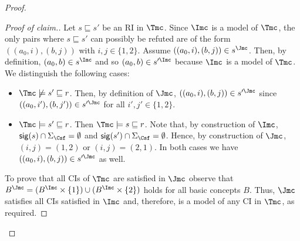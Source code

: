 \documentclass{lmcs}
\theoremstyle{definition}
\let\OriginalQedSymbol\qedsymbol
\renewcommand{\qedsymbol}{\OriginalQedSymbol\setcounter{claim}{0}}
\let\NormalQedSymbol\qedsymbol
\newenvironment{clmproof}[1]{\renewcommand{\qedsymbol}{$\dashv$}\begin{proof}[Proof of claim.]\space#1}{\end{proof}\renewcommand{\qedsymbol}{\NormalQedSymbol}}
\begin{document}
\begin{proof}
\begin{clmproof}
Let $s\sqsubseteq s'$ be an RI in $\Tmc$. Since $\Imc$ is a
model of $\Tmc$, the only pairs where $s\sqsubseteq s'$ can possibly
be refuted are of the form $((a_{0},i),(b,j))$ with $i,j\in \{1,2\}$.
Assume $((a_{0},i),(b,j)) \in s^{\Jmc}$. Then, by definition,
$(a_{0},b)\in s^{\Imc}$ and so $(a_{0},b)\in s'^{\Imc}$ because $\Imc$
is a model of $\Tmc$. We distinguish the following cases:
%
\begin{itemize}
\item $\Tmc \not\models s'\sqsubseteq r$. Then, by definition of
  $\Jmc$, $((a_{0},i),(b,j))\in s'^{\Jmc}$ since
  $((a_{0},i'),(b,j'))\in s'^{\Jmc}$ for all $i',j'\in \{1,2\}$.
\item $\Tmc\models s'\sqsubseteq r$. Then $\Tmc\models s \sqsubseteq
  r$. Note that, by construction of $\Imc$, ${\sf sig}(s)\cap
  \Sigma_\Csf=\emptyset$ and ${\sf sig}(s')\cap
  \Sigma_\Csf=\emptyset$.  Hence, by construction of $\Jmc$, $(i,j) =
  (1,2)$ or $(i,j)=(2,1)$.  In both cases we have
  $((a_{0},i),(b,j))\in s'^{\Jmc}$ as well.
\end{itemize}
To prove that all CIs of $\Tmc$ are satisfied in $\Jmc$
observe that $B^{\Jmc}= (B^{\Imc} \times \{1\})\cup (B^{\Imc}\times \{2\})$ holds for all 
basic concepts $B$. Thus, $\Jmc$ satisfies all CIs satisfied in 
$\Imc$ and, therefore, is a model of any CI in $\Tmc$, as required.
\end{clmproof}


\end{proof}
\end{document}
